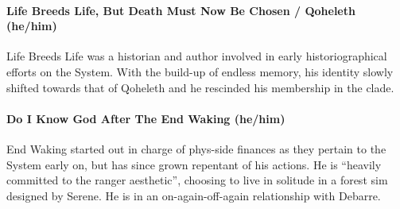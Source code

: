 \paragraph{Life Breeds Life, But Death Must Now Be Chosen / Qoheleth (he/him)}

Life Breeds Life was a historian and author involved in early historiographical efforts on the System. With the build-up of endless memory, his identity slowly shifted towards that of Qoheleth and he rescinded his membership in the clade.

\begin{comment}
\emph{Appears in:}

\begin{itemize}
\tightlist
\item
  \href{https://qoheleth.post-self.ink}{\emph{Qoheleth}}
\item
  \href{https://toledot.post-self.ink}{\emph{Toledot}} (mentioned)
\item
  \href{https://neviim.post-self.ink}{\emph{Nevi'im}} (mentioned)
\item
  \href{https://mitzvot.post-self.ink}{\emph{Mitzvot}} (mentioned)
\end{itemize}
\end{comment}

\paragraph{Do I Know God After The End Waking (he/him)}

End Waking started out in charge of phys-side finances as they pertain to the System early on, but has since grown repentant of his actions. He is ``heavily committed to the ranger aesthetic'', choosing to live in solitude in a forest sim designed by Serene. He is in an on-again-off-again relationship with Debarre.

\begin{comment}
\emph{Appears in:}

\begin{itemize}
\tightlist
\item
  \href{https://toledot.post-self.ink}{\emph{Toledot}}
\item
  \href{https://neviim.post-self.ink}{\emph{Nevi'im}}
\item
  \href{https://mitzvot.post-self.ink}{\emph{Mitzvot}}
\item
  ``Selected Letters'' (mentioned)
\end{itemize}
\end{comment}

